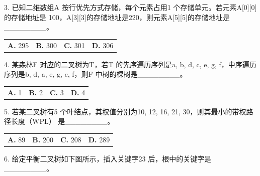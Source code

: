 \documentclass[UTF8,11pt]{ctexart}
\begin{document}
3. 已知二维数组A 按行优先方式存储，每个元素占用1 个存储单元。若元素A[0][0]的存储地址是 100，A[3][3]的存储地址是220，则元素A[5][5]的存储地址是\_\_\_\_\_\_\_\_。


\begin{center}\begin{tabular}{>{\raggedright\arraybackslash}p{\dimexpr(\linewidth-8\tabcolsep)/4\relax}>{\raggedright\arraybackslash}p{\dimexpr(\linewidth-8\tabcolsep)/4\relax}>{\raggedright\arraybackslash}p{\dimexpr(\linewidth-8\tabcolsep)/4\relax}>{\raggedright\arraybackslash}p{\dimexpr(\linewidth-8\tabcolsep)/4\relax}}
\textbf{A.} 295 & \textbf{B.} 300 & \textbf{C.} 301 & \textbf{D.} 306\\[.35em]\end{tabular}\end{center}

4. 某森林F 对应的二叉树为T，若T 的先序遍历序列是a, b, d, c, e, g, f，中序遍历序列是b, d, a, e, g, c, f，则F 中树的棵树是\_\_\_\_\_\_\_\_。


\begin{center}\begin{tabular}{>{\raggedright\arraybackslash}p{\dimexpr(\linewidth-8\tabcolsep)/4\relax}>{\raggedright\arraybackslash}p{\dimexpr(\linewidth-8\tabcolsep)/4\relax}>{\raggedright\arraybackslash}p{\dimexpr(\linewidth-8\tabcolsep)/4\relax}>{\raggedright\arraybackslash}p{\dimexpr(\linewidth-8\tabcolsep)/4\relax}}
\textbf{A.} 1 & \textbf{B.} 2 & \textbf{C.} 3 & \textbf{D.} 4\\[.35em]\end{tabular}\end{center}

5. 若某二叉树有5 个叶结点，其权值分别为10, 12, 16, 21, 30，则其最小的带权路径长度（WPL） 是\_\_\_\_\_\_\_\_。


\begin{center}\begin{tabular}{>{\raggedright\arraybackslash}p{\dimexpr(\linewidth-8\tabcolsep)/4\relax}>{\raggedright\arraybackslash}p{\dimexpr(\linewidth-8\tabcolsep)/4\relax}>{\raggedright\arraybackslash}p{\dimexpr(\linewidth-8\tabcolsep)/4\relax}>{\raggedright\arraybackslash}p{\dimexpr(\linewidth-8\tabcolsep)/4\relax}}
\textbf{A.} 89 & \textbf{B.} 200 & \textbf{C.} 208 & \textbf{D.} 289\\[.35em]\end{tabular}\end{center}

6. 给定平衡二叉树如下图所示，插入关键字23 后，根中的关键字是\_\_\_\_\_\_\_\_。
\end{document}
